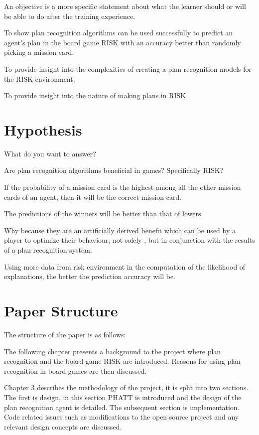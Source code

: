 \documentclass[parskip]{cs4rep}
\begin{document}
An objective is a more specific statement about what the learner should or will be able to do after the training experience.

To show plan recognition algorithms can be used successfully to predict an agent's plan in the board game RISK with an accuracy better than randomly picking a mission card.

To provide insight into the complexities of creating a plan recognition models for the RISK environment.

To provide insight into the nature of making plans in RISK. 

\section{Hypothesis}

What do you want to answer?

Are plan recognition algorithms beneficial in games? Specifically RISK?

If the probability of a mission card is the highest among all the other mission cards of an agent, then it will be the correct mission card.

The predictions of the winners will be better than that of lowers.

Why because they are an artificially derived benefit which can be used by a player to optimize their behaviour, not solely , but in conjunction with the results of a plan recognition system.

Using more data from risk environment in the computation of the likelihood of explanations, the better the prediction accuracy will be.

\section{Paper Structure}

The structure of the paper is as follows:

The following chapter presents a background to the project where plan recognition and the board game RISK are introduced. Reasons for using plan recognition in board games are then discussed.

Chapter 3 describes the methodology of the project, it is split into two sections. The first is design, in this section PHATT is introduced and the design of the plan recognition agent is detailed. The subsequent section is implementation. Code related issues such as modifications to the open source project and any relevant design concepts are discussed. 
\end{document}
